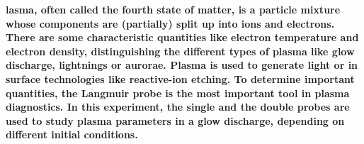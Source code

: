 \textbf{lasma, often called the fourth state of matter, is a particle mixture whose components are (partially) split up into ions and electrons. There are some characteristic quantities like electron temperature and electron density, distinguishing the different types of plasma like glow discharge, lightnings or aurorae. Plasma is used to generate light or in surface technologies like reactive-ion etching. To determine important quantities, the Langmuir probe is the most important tool in plasma diagnostics. In this experiment, the single and the double probes are used to study plasma parameters in a glow discharge, depending on different initial conditions.}